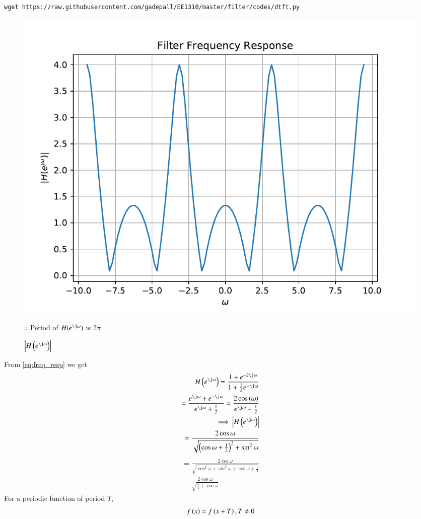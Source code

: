\documentclass[journal,12pt,twocolumn]{IEEEtran}
\renewcommand\thesection{\arabic{section}}
\begin{document}
\begin{enumerate}[label=\thesection.\arabic*]
		\begin{lstlisting}
wget https://raw.githubusercontent.com/gadepall/EE1310/master/filter/codes/dtft.py
		\end{lstlisting}
		\begin{figure}[!ht]
			\centering
			\includegraphics[width=\columnwidth]{./figs/dtft}
			\caption{$\abs{H\brak{e^{\j\omega}}}$}
\label{fig:dtft}
	\raggedright{ \quad \quad $\therefore$ Period of $H(e^{\j \omega})$ is $2\pi$\\}
		\end{figure}
\solution From \eqref{eq:freq_resp} we get
	\begin{align}
		H\brak{e^{\j \omega}}=\frac{1 + e^{-2\j \omega}}{1 + \frac{1}{2}e^{-\j \omega}}\\
		=\frac{e^{\j \omega} + e^{-\j \omega}}{e^{\j \omega} + \frac{1}{2}}
		=\frac{2\cos\brak{\omega}}{e^{\j \omega} + \frac{1}{2}}\\
		\implies \abs{H\brak{e^{\j \omega}}}\\
		=\frac{2\cos\omega}{\sqrt{\brak{\cos\omega+\frac{1}{2}}^{2}+\sin^2\omega}}
	\end{align}
	\begin{align}
		=\frac{2\cos\omega}{\sqrt{\cos^2\omega + \sin^2 \omega + \cos \omega + \frac{1}{4}}}\\
		=\frac{2\cos\omega}{\sqrt{\frac{5}{4}+\cos\omega}}
	\end{align}
	For a periodic function of period $T$,
	\begin{align}
		f\brak{x} = f\brak{x+T}, T \neq 0	 

\end{align}
\end{enumerate}
\end{document}
